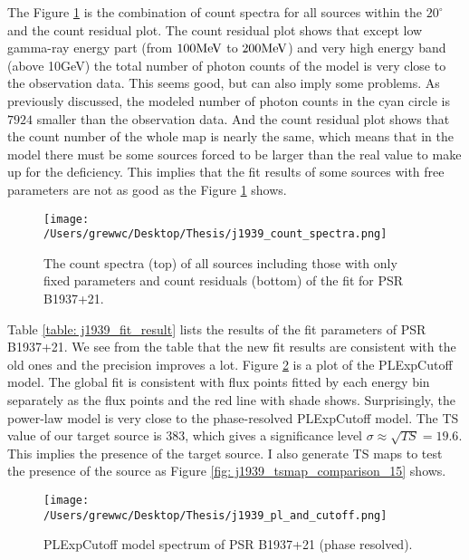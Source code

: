\documentclass[12pt]{report}
\begin{document}
          The Figure \ref{fig: j1939_count_spectra} is the combination of count spectra for 
          all sources within the $20^{\circ}$ and the count residual plot. The count residual 
          plot shows that except low gamma-ray energy part (from $100\hbox{MeV}$ to 
          $200\hbox{MeV}$) and very high energy band (above 10GeV) the total number of photon 
          counts of the model is very close to the observation data. This seems good, but can 
          also imply some problems. As previously discussed, the modeled number of photon counts 
          in the cyan circle is $7924$ smaller than the observation data. And the count residual 
          plot shows that the count number of the whole map is nearly the same, which means that 
          in the model there must be some sources forced to be larger than the real value to make 
          up for the deficiency. This implies that the fit results of some sources with free 
          parameters are not as good as the Figure \ref{fig: j1939_count_spectra} shows. 
          
          \begin{figure}[!htp]
            \centering
            \texttt{[image: /Users/grewwc/Desktop/Thesis/j1939\_count\_spectra.png]}
            \caption{The count spectra (top) of all sources including those with only fixed 
              parameters and count residuals (bottom) of the fit for PSR B1937+21.}
            \label{fig: j1939_count_spectra}
          \end{figure}

          Table \ref{table: j1939_fit_result} lists the results of the fit parameters of 
          PSR B1937+21. We see from the table that the new fit results are 
          consistent with the old ones and the precision improves a lot. 
          Figure \ref{fig: j1939_pl_and_cutoff} is a plot of the PLExpCutoff model.
          The global fit is consistent with flux points fitted by each energy bin separately 
          as the flux points and the red line with shade shows. Surprisingly, the power-law model
          is very close to the phase-resolved PLExpCutoff model. 
          The TS value of our target source is $383$, which gives 
          a significance level $\sigma \approx \sqrt{TS} = 19.6$. This implies the presence 
          of the target source. I also generate TS maps to test the presence of the source 
          as Figure \ref{fig: j1939_tsmap_comparison_15} shows. 
          
          \begin{figure}[!htp]
            \centering 
            \texttt{[image: /Users/grewwc/Desktop/Thesis/j1939\_pl\_and\_cutoff.png]}
            \caption{PLExpCutoff model spectrum of PSR B1937+21 (phase resolved). }
            \label{fig: j1939_pl_and_cutoff}
          \end{figure}
          
\end{document}
